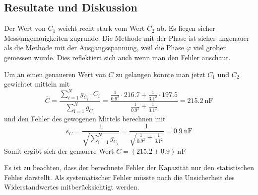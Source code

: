 \subsection{Resultate und Diskussion}

Der Wert von $C_1$ weicht recht stark vom Wert $C_2$ ab. Es liegen sicher Messungenauigkeiten
zugrunde. Die Methode mit der Phase ist sicher ungenauer als die Methode mit der Ausgangsspannung,
weil die Phase $\varphi$ viel grober gemessen wurde. Dies reflektiert sich auch wenn man den Fehler
anschaut.

Um an einen genaueren Wert von $C$ zu gelangen k\"onnte man jetzt $C_1$ und $C_2$ gewichtet
mitteln mit
\begin{equation}
    \bar{C} = \frac{ \sum_{i=1}^{N} g_{\bar{C}_i} \cdot C_i }{ \sum_{í=1}^{N} g_{\bar{C}_i} }
            = \frac{ \frac{1}{0.9^2} \cdot 216.7 + \frac{1}{3.1^2} \cdot 197.5}{ \frac{1}{0.9^2} + \frac{1}{3.1^2} } = \SI{215.2}{\nano\farad}
\end{equation}
und den Fehler des gewogenen Mittels berechnen mit
\begin{equation}
    s_{\bar{C}} = \frac{1}{\sqrt{\sum_{i=1}^{N} g_{\bar{C}_i}}} = \frac{1}{\sqrt{\frac{1}{0.9^2} + \frac{1}{3.1^2}}} = \SI{0.9}{\nano\farad}
\end{equation}
Somit ergibt sich der genauere Wert $C = (215.2 \pm 0.9) \SI{}{\nano\farad}$

Es ist zu beachten, dass der berechnete Fehler der Kapazit\"at nur den statistischen Fehler
darstellt. Als systematischer Fehler m\"usste noch die Unsicherheit des Widerstandwertes
mitber\"ucksichtigt werden.

